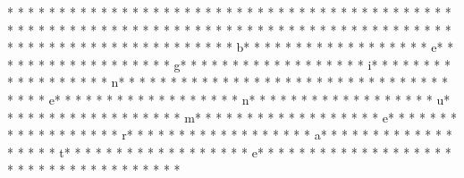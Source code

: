 * * *  * * *  * * *  *  * * *  *  * * *  * 	* * *  * * *  * * *  *  * * *  *  * * *  * 	* * *  * * *  * * *  *  * * *  *  * * *  * 
* * *  * * *  * * *  *  * * *  *  * * *  * 	* * *  * * *  * * *  *  * * *  *  * * *  * 	* * *  * * *  * * *  *  * * *  *  * * *  * b* * *  * * *  * * *  *  * * *  *  * * *  * e* * *  * * *  * * *  *  * * *  *  * * *  * g* * *  * * *  * * *  *  * * *  *  * * *  * i* * *  * * *  * * *  *  * * *  *  * * *  * n* * *  * * *  * * *  *  * * *  *  * * *  * {* * *  * * *  * * *  *  * * *  *  * * *  * e* * *  * * *  * * *  *  * * *  *  * * *  * n* * *  * * *  * * *  *  * * *  *  * * *  * u* * *  * * *  * * *  *  * * *  *  * * *  * m* * *  * * *  * * *  *  * * *  *  * * *  * e* * *  * * *  * * *  *  * * *  *  * * *  * r* * *  * * *  * * *  *  * * *  *  * * *  * a* * *  * * *  * * *  *  * * *  *  * * *  * t* * *  * * *  * * *  *  * * *  *  * * *  * e* * *  * * *  * * *  *  * * *  *  * * *  * }* * *  * * *  * * *  *  * * *  *  * * *  * 
